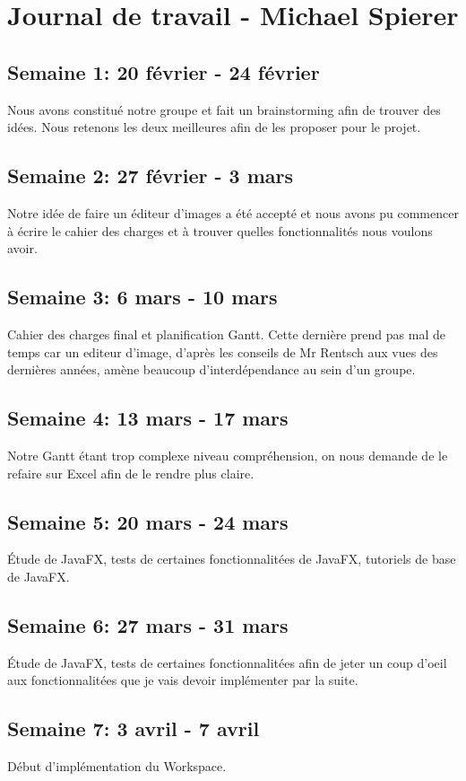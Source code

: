 \section{Journal de travail - Michael Spierer}

\subsection{Semaine 1: 20 février - 24 février}
Nous avons constitué notre groupe et fait un brainstorming afin de trouver des idées. Nous retenons les deux meilleures afin de les proposer pour le projet.
\subsection{Semaine 2: 27 février - 3 mars}
Notre idée de faire un éditeur d'images a été accepté et nous avons pu commencer à écrire le cahier des charges et à trouver quelles fonctionnalités nous voulons avoir.
\subsection{Semaine 3: 6 mars - 10 mars}
Cahier des charges final et planification Gantt. Cette dernière prend pas mal de temps car un editeur d'image, d'après les conseils de Mr Rentsch aux vues des dernières années, amène beaucoup d'interdépendance au sein d'un groupe.
\subsection{Semaine 4: 13 mars - 17 mars}
Notre Gantt étant trop complexe niveau compréhension, on nous demande de le refaire sur Excel afin de le rendre plus claire. 
\subsection{Semaine 5: 20 mars - 24 mars}
Étude de JavaFX, tests de certaines fonctionnalitées de JavaFX, tutoriels de base de JavaFX.
\subsection{Semaine 6: 27 mars - 31 mars}
Étude de JavaFX, tests de certaines fonctionnalitées afin de jeter un coup d'oeil aux fonctionnalitées que je vais devoir implémenter par la suite.
\subsection{Semaine 7: 3 avril - 7 avril}
Début d'implémentation du Workspace.
